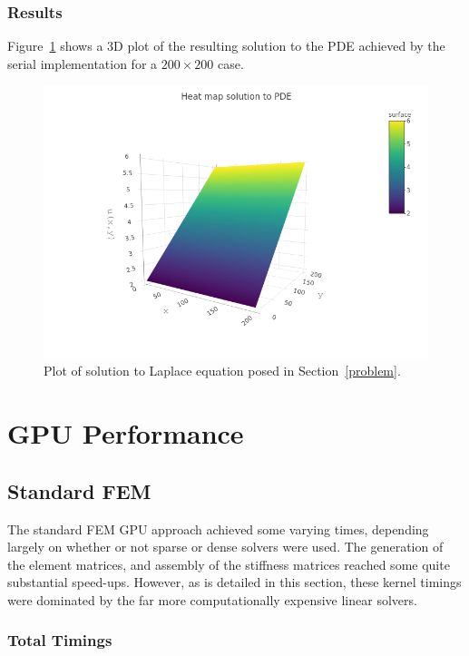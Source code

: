\subsubsection{Results}

Figure~\ref{fig:results} shows a 3D plot of the resulting solution to the PDE achieved by the serial implementation for a $200\times 200$ case.

\begin{figure}
	\centering
	\includegraphics[width = 0.8\linewidth]{Plots/3d_soln}
	\caption{Plot of solution to Laplace equation posed in Section~\ref{problem}.}
	\label{fig:results}
\end{figure}
\section{GPU Performance}

\subsection{Standard FEM}

The standard FEM GPU approach achieved some varying times, depending largely on whether or not sparse or dense solvers were used. The generation of the element matrices, and assembly of the stiffness matrices reached some quite substantial speed-ups. However, as is detailed in this section, these kernel timings were dominated by the far more computationally expensive linear solvers.

\subsubsection{Total Timings}

